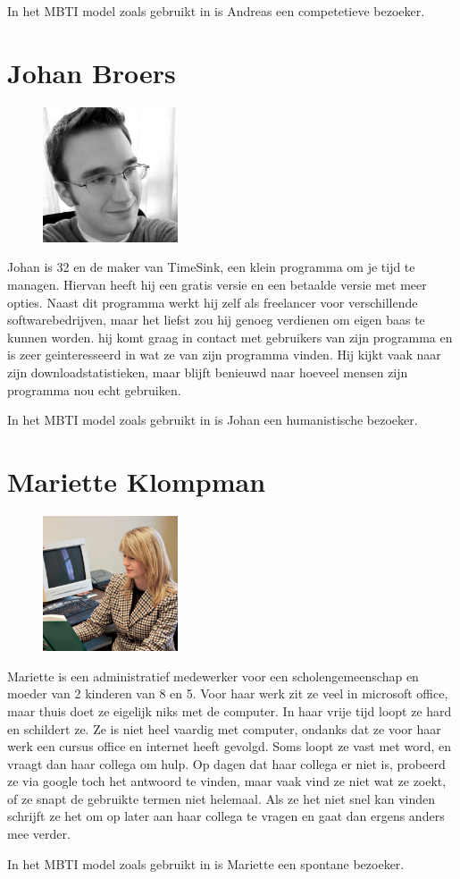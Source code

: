 In het MBTI model zoals gebruikt in \cite{Klompsma} is Andreas een competetieve bezoeker.

\section{Johan Broers}
  \begin{figure}
      \includegraphics[height=40mm]{../images/personas/johan}
  \end{figure}
Johan is 32 en de maker van TimeSink, een klein programma om je tijd te managen. Hiervan heeft hij een gratis versie en een betaalde versie met meer opties. Naast dit programma werkt hij zelf als freelancer voor verschillende softwarebedrijven, maar het liefst zou hij genoeg verdienen om eigen baas te kunnen worden. hij komt graag in contact met gebruikers van zijn programma en is zeer geinteresseerd in wat ze van zijn programma vinden. Hij kijkt vaak naar zijn downloadstatistieken, maar blijft benieuwd naar hoeveel mensen zijn programma nou echt gebruiken.

In het MBTI model zoals gebruikt in \cite{Klompsma} is Johan een humanistische bezoeker.

\section{Mariette Klompman}
  \begin{figure}
      \includegraphics[height=40mm]{../images/personas/mariette}
  \end{figure}
Mariette is een administratief medewerker voor een scholengemeenschap en moeder van 2 kinderen van 8 en 5. Voor haar werk zit ze veel in microsoft office, maar thuis doet ze eigelijk niks met de computer. In haar vrije tijd loopt ze hard en schildert ze. Ze is niet heel vaardig met computer, ondanks dat ze voor haar werk een cursus office en internet heeft gevolgd. Soms loopt ze vast met word, en vraagt dan haar collega om hulp. Op dagen dat haar collega er niet is, probeerd ze via google toch het antwoord te vinden, maar vaak vind ze niet wat ze zoekt, of ze snapt de gebruikte termen niet helemaal. Als ze het niet snel kan vinden schrijft ze het om op later aan haar collega te vragen en gaat dan ergens anders mee verder.

In het MBTI model zoals gebruikt in \cite{Klompsma} is Mariette een spontane bezoeker.

